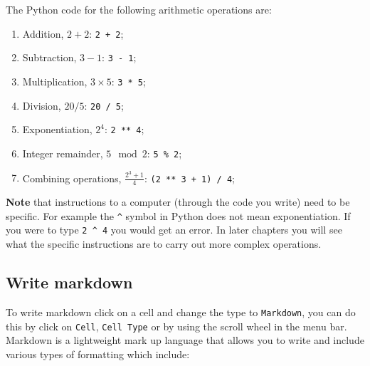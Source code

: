 The Python code for the following arithmetic operations are:

\begin{enumerate}

\item 

Addition, \(2 + 2\): \texttt{2 + 2};

\item 

Subtraction, \(3 - 1\): \texttt{3 - 1};

\item 

Multiplication, \(3 \times 5\): \texttt{3 * 5};

\item 

Division, \(20 / 5\): \texttt{20 / 5};

\item 

Exponentiation, \(2 ^ 4\): \texttt{2 ** 4};

\item 

Integer remainder, \(5 \mod 2\): \texttt{5 \% 2};

\item 

Combining operations, \(\frac{2 ^ 3 + 1}{4}\): \texttt{(2 ** 3 + 1) / 4};

\end{enumerate}


\textbf{Note} that instructions to a computer (through the code you write) need
to be specific. For example the \texttt{\textasciicircum{}} symbol in Python
does not mean exponentiation. If you were to type \texttt{2 \textasciicircum{} 4} you would get an error.
In later chapters you will see what the specific instructions are to carry out more complex operations.

\subsection{Write markdown}

To write markdown click on a cell and change the type to \texttt{Markdown}, you can do
this by click on \texttt{Cell}, \texttt{Cell Type} or by using the scroll wheel in the menu
bar.
Markdown is a lightweight mark up language that allows you to write and
include various types of formatting which include:

